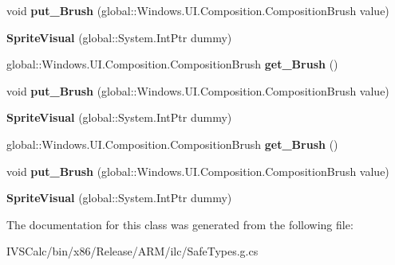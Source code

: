 \begin{DoxyCompactItemize}
\item 
\mbox{\label{class_windows_1_1_u_i_1_1_composition_1_1_sprite_visual_aefd27cc06b2e04c7c8177472a8571679}} 
void {\bfseries put\+\_\+\+Brush} (global\+::\+Windows.\+U\+I.\+Composition.\+Composition\+Brush value)
\item 
\mbox{\label{class_windows_1_1_u_i_1_1_composition_1_1_sprite_visual_ac74110ddcbef435de17c2bfd5813f7ba}} 
{\bfseries Sprite\+Visual} (global\+::\+System.\+Int\+Ptr dummy)
\item 
\mbox{\label{class_windows_1_1_u_i_1_1_composition_1_1_sprite_visual_a01923ba0550c97deee1067dcb9ec1eab}} 
global\+::\+Windows.\+U\+I.\+Composition.\+Composition\+Brush {\bfseries get\+\_\+\+Brush} ()
\item 
\mbox{\label{class_windows_1_1_u_i_1_1_composition_1_1_sprite_visual_aefd27cc06b2e04c7c8177472a8571679}} 
void {\bfseries put\+\_\+\+Brush} (global\+::\+Windows.\+U\+I.\+Composition.\+Composition\+Brush value)
\item 
\mbox{\label{class_windows_1_1_u_i_1_1_composition_1_1_sprite_visual_ac74110ddcbef435de17c2bfd5813f7ba}} 
{\bfseries Sprite\+Visual} (global\+::\+System.\+Int\+Ptr dummy)
\item 
\mbox{\label{class_windows_1_1_u_i_1_1_composition_1_1_sprite_visual_a01923ba0550c97deee1067dcb9ec1eab}} 
global\+::\+Windows.\+U\+I.\+Composition.\+Composition\+Brush {\bfseries get\+\_\+\+Brush} ()
\item 
\mbox{\label{class_windows_1_1_u_i_1_1_composition_1_1_sprite_visual_aefd27cc06b2e04c7c8177472a8571679}} 
void {\bfseries put\+\_\+\+Brush} (global\+::\+Windows.\+U\+I.\+Composition.\+Composition\+Brush value)
\item 
\mbox{\label{class_windows_1_1_u_i_1_1_composition_1_1_sprite_visual_ac74110ddcbef435de17c2bfd5813f7ba}} 
{\bfseries Sprite\+Visual} (global\+::\+System.\+Int\+Ptr dummy)
\end{DoxyCompactItemize}


The documentation for this class was generated from the following file\+:\begin{DoxyCompactItemize}
\item 
I\+V\+S\+Calc/bin/x86/\+Release/\+A\+R\+M/ilc/Safe\+Types.\+g.\+cs\end{DoxyCompactItemize}
